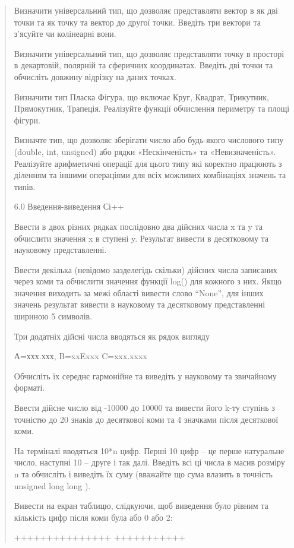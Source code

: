 \documentclass[]{article}
\begin{document}
\begin{quote}
Визначити універсальний тип, що дозволяє представляти вектор в як дві
точки та як точку та вектор до другої точки. Введіть три вектори та
з'ясуйте чи колінеарні вони.

Визначити універсальний тип, що дозволяє представляти точку в просторі в
декартовій, полярній та сферичних координатах. Введіть дві точки та
обчисліть довжину відрізку на даних точках.

Визначити тип Пласка Фігура, що включає Круг, Квадрат, Трикутник,
Прямокутник, Трапеція. Реалізуйте функції обчислення периметру та площі
фігури.

Визначте тип, що дозволяє зберігати число або будь-якого числового типу
(double, int, unsigned) або рядки «Нескінченість» та «Невизначеність».
Реалізуйте арифметичні операції для цього типу які коректно працюють з
діленням та іншими операціями для всіх можливих комбінаціях значень та
типів.

6.0 Введення-виведення Сі++

\protect\hypertarget{_Hlk65238415}{}{}Ввести в двох різних рядках
послідовно два дійсних числа x та y та обчислити значення x в ступені y.
Результат вивести в десятковому та науковому представленні.

\protect\hypertarget{_Hlk65238515}{}{}Ввести декілька (невідомо
зазделегідь скільки) дійсних числа записаних через коми та обчислити
значення функції log() для кожного з них. Якщо значення виходить за межі
області вивести слово ``None'', для інших значень результат вивести в
науковому та десятковому представленні шириною 5 символів.

Три додатніх дійсні числа вводяться як рядок вигляду

А=ххх.ххх, B=xxExxx C=xxx.xxxx

Обчисліть їх середнє гармонійне та виведіть у науковому та звичайному
форматі.

Ввести дійсне число від -10000 до 10000 та вивести його k-ту ступінь з
точністю до 20 знаків до десяткової коми та 4 значками після десяткової
коми.

\protect\hypertarget{_Hlk65238442}{}{}На терміналі вводяться 10*n цифр.
Перші 10 цифр -- це перше натуральне число, наступні 10 -- друге і так
далі. Введіть всі ці числа в масив розміру n та обчисліть і виведіть їх
суму (вважайте що сума влазить в точність unsigned long long ).

Вивести на екран таблицю, слідкуючи, щоб виведення було рівним та
кількість цифр після коми була або 0 або 2:

+++++++++++++++ +++++++++++


\end{quote}
\end{document}
